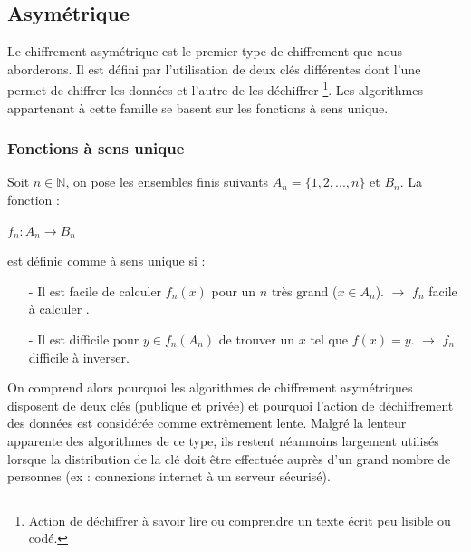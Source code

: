 \documentclass[letterpaper]{article}
\begin{document}
\subsection{Asymétrique}
Le chiffrement asymétrique est le premier type de chiffrement que nous aborderons. Il est défini par l'utilisation de deux clés différentes dont l'une permet de chiffrer les données et l'autre de les déchiffrer \footnote{Action de déchiffrer à savoir lire ou comprendre un texte écrit peu lisible ou codé.}. Les algorithmes appartenant à cette famille se basent sur les fonctions à sens unique.
\subsubsection{Fonctions à sens unique} Soit $n \in \mathbb{N} $, on pose les ensembles finis suivants  $ A_n = \{ 1,2,...,n \} $ et $B_n$. La fonction : 
\begin{center}
$f_n : A_n \rightarrow B_n$
\end{center}
est définie comme à sens unique si : \vspace{0.03cm}
\begin{itemize}
\item[-] Il est facile de calculer $f_n(x)$ pour un $n$ très grand ($x \in A_n$). $\rightarrow$ $f_n$ facile à calculer .
\item[-] Il est difficile pour $y \in f_n(A_n)$ de trouver un $x$ tel que $f(x) = y$. $\rightarrow$ $f_n$ difficile à inverser. \\
\end{itemize}
On comprend alors pourquoi les algorithmes de chiffrement asymétriques disposent de deux clés (publique et privée) et pourquoi l'action de déchiffrement des données est considérée comme extrêmement lente. Malgré la lenteur apparente des algorithmes de ce type, ils restent néanmoins largement utilisés lorsque la distribution de la clé doit être effectuée auprès d'un grand nombre de personnes (ex : connexions internet à un serveur sécurisé).
\end{document}
